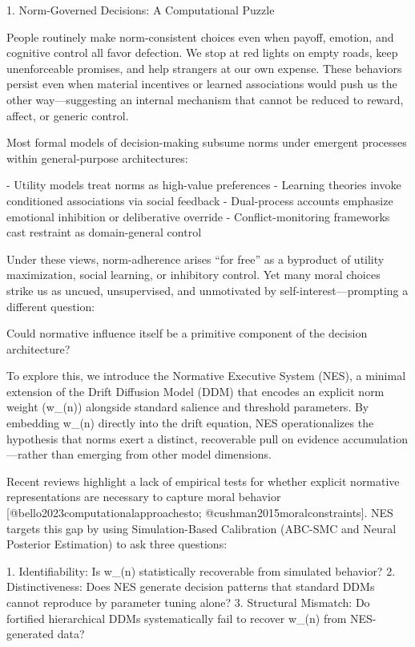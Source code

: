 1. Norm-Governed Decisions: A Computational Puzzle

People routinely make norm-consistent choices even when payoff, emotion,
and cognitive control all favor defection. We stop at red lights on
empty roads, keep unenforceable promises, and help strangers at our own
expense. These behaviors persist even when material incentives or
learned associations would push us the other way—suggesting an internal
mechanism that cannot be reduced to reward, affect, or generic control.

Most formal models of decision-making subsume norms under emergent
processes within general-purpose architectures:

- Utility models treat norms as high-value preferences
- Learning theories invoke conditioned associations via social feedback
- Dual-process accounts emphasize emotional inhibition or deliberative
  override
- Conflict-monitoring frameworks cast restraint as domain-general
  control

Under these views, norm-adherence arises “for free” as a byproduct of
utility maximization, social learning, or inhibitory control. Yet many
moral choices strike us as uncued, unsupervised, and unmotivated by
self-interest—prompting a different question:

  Could normative influence itself be a primitive component of the
  decision architecture?

To explore this, we introduce the Normative Executive System (NES), a
minimal extension of the Drift Diffusion Model (DDM) that encodes an
explicit norm weight (w_(n)) alongside standard salience and threshold
parameters. By embedding w_(n) directly into the drift equation, NES
operationalizes the hypothesis that norms exert a distinct, recoverable
pull on evidence accumulation—rather than emerging from other model
dimensions.

Recent reviews highlight a lack of empirical tests for whether explicit
normative representations are necessary to capture moral behavior
[@bello2023computationalapproachesto; @cushman2015moralconstraints]. NES
targets this gap by using Simulation-Based Calibration (ABC-SMC and
Neural Posterior Estimation) to ask three questions:

1.  Identifiability: Is w_(n) statistically recoverable from simulated
    behavior?
2.  Distinctiveness: Does NES generate decision patterns that standard
    DDMs cannot reproduce by parameter tuning alone?
3.  Structural Mismatch: Do fortified hierarchical DDMs systematically
    fail to recover w_(n) from NES-generated data?

